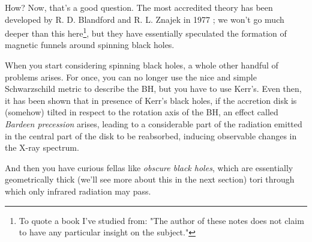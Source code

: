 \par How? Now, that's a good question. The most accredited theory has been developed by R. D. Blandford and R. L. Znajek in 1977 \cite{1977MNRAS.179..433B}; we won't go much deeper than this here\footnote{To quote a book I've studied from: "The author of these notes does not claim to have any particular insight on the subject."}, but they have essentially speculated the formation of magnetic funnels around spinning black holes.
\par When you start considering spinning black holes, a whole other handful of problems arises. For once, you can no longer use the nice and simple Schwarzschild metric to describe the BH, but you have to use Kerr's. Even then, it has been shown that in presence of Kerr's black holes, if the accretion disk is (somehow) tilted in respect to the rotation axis of the BH, an effect called \emph{Bardeen precession} \cite{1975ApJ...195L..65B} arises, leading to a considerable part of the radiation emitted in the central part of the disk to be reabsorbed, inducing observable changes in the X-ray spectrum.
\par And then you have curious fellas like \emph{obscure black holes}, which are essentially geometrically thick (we'll see more about this in the next section) tori through which only infrared radiation may pass. 
